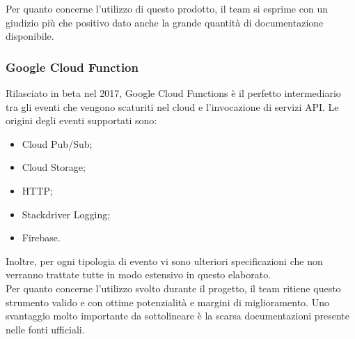 Per quanto concerne l'utilizzo di questo prodotto, il team si esprime con un giudizio più che positivo dato anche la grande quantità di documentazione disponibile.
\subsubsection{Google Cloud Function}
Rilasciato in beta nel 2017, Google Cloud Functions è il perfetto intermediario tra gli eventi che vengono scaturiti nel cloud e l'invocazione di servizi API. Le origini degli eventi supportati sono:
\begin{itemize}
	\item Cloud Pub/Sub;
	\item Cloud Storage;
	\item HTTP;
	\item Stackdriver Logging;
	\item Firebase. 
\end{itemize}
Inoltre, per ogni tipologia di evento vi sono ulteriori specificazioni che non verranno trattate tutte in modo estensivo in questo elaborato.
\\
Per quanto concerne l'utilizzo svolto durante il progetto, il team ritiene questo strumento valido e con ottime potenzialità e margini di miglioramento. Uno svantaggio molto importante da sottolineare è la scarsa documentazioni presente nelle fonti ufficiali.
